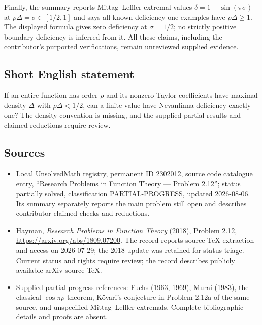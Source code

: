 \documentclass[11pt]{article}
\begin{document}
Finally, the summary reports Mittag--Leffler extremal values $\delta=1-\sin(\pi\sigma)$ at $\rho\Delta=\sigma\in[1/2,1]$ and says all known deficiency-one examples have $\rho\Delta\geq1$. The displayed formula gives zero deficiency at $\sigma=1/2$; no strictly positive boundary deficiency is inferred from it. All these claims, including the contributor's purported verifications, remain unreviewed supplied evidence.
\subsection{Short English statement}
If an entire function has order $\rho$ and its nonzero Taylor coefficients have maximal density $\Delta$ with $\rho\Delta<1/2$, can a finite value have Nevanlinna deficiency exactly one? The density convention is missing, and the supplied partial results and claimed reductions require review.
\subsection{Sources}
\begin{itemize}
\item Local UnsolvedMath registry, permanent ID 2302012, source code catalogue entry, ``Research Problems in Function Theory --- Problem 2.12''; status partially solved, classification PARTIAL-PROGRESS, updated 2026-08-06. Its summary separately reports the main problem still open and describes contributor-claimed checks and reductions.
\item Hayman, \emph{Research Problems in Function Theory} (2018), Problem 2.12, \url{https://arxiv.org/abs/1809.07200}. The record reports source-TeX extraction and access on 2026-07-29; the 2018 update was retained for status triage. Current status and rights require review; the record describes publicly available arXiv source TeX.
\item Supplied partial-progress references: Fuchs (1963, 1969), Murai (1983), the classical $\cos\pi\rho$ theorem, K\H{o}vari's conjecture in Problem 2.12a of the same source, and unspecified Mittag--Leffler extremals. Complete bibliographic details and proofs are absent.
\end{itemize}
\end{document}
